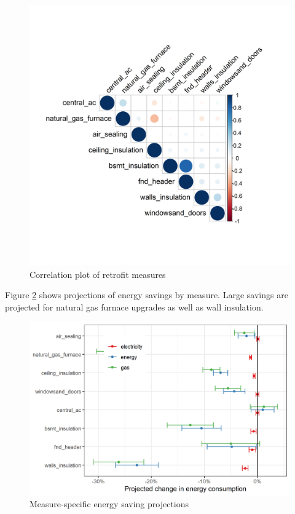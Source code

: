 \documentclass{article}
\begin{document}
\begin{figure}
	\includegraphics{"../output_figures_tables/correlation_plot.png"}
	\caption{Correlation plot of retrofit measures}\label{fig_corplot}
\end{figure}

Figure \ref{fig_mbm_proj} shows projections of energy savings by measure. Large savings are projected for natural gas furnace upgrades as well as wall insulation.

\begin{figure}
	\includegraphics{../output_figures_tables/projected_es_mbm.png}
	\caption{Measure-specific energy saving projections}\label{fig_mbm_proj}
\end{figure}
\end{document}
